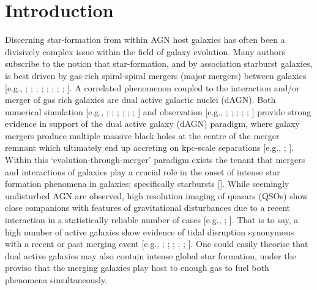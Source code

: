 \section{Introduction}

Discerning star-formation from within AGN host galaxies has often been a divisively complex issue within the field of galaxy evolution. Many authors subscribe to the notion that star-formation, and by association starburst galaxies, is best driven by gas-rich spiral-spiral mergers (major mergers) between galaxies [e.g., \cite{thews_Neugebauer_Scoville_1988}; \cite{Mihos_Hernquist_1996}; \cite{1997AA...326..537D}; \cite{Barton_Geller_Kenyon_2000}; \cite{Tissera_Dominguez-Tenreiro_Scannapieco_Saiz_2002}; \cite{2005A&A...438...87K}; \cite{Narayanan_Groppi_Kulesa_Walker_2005}; \cite{Narayanan_Hayward_Murray_2013}; \cite{Scott_Kaviraj_2013}]. A correlated phenomenon coupled to the interaction and/or merger of gas rich galaxies are dual active galactic nuclei (dAGN). Both numerical simulation [e.g., \cite{Hoffman_Loeb_2007}; \cite{a_Eichhorn_Makino_Spurzem_2010}; \cite{Shen_2010}; \cite{Yu_2011}; \cite{2013MNRAS.429.2594B}; \cite{Kulkarni_Loeb_2012}; \cite{Van_Wassenhove_2014}] and observation [e.g., \cite{ice_Ivison_Lin_Koo_et_al__2007}; \cite{2009ApJ...702L..82C}; \cite{ario_Shields_Smith_Wright_2011}; \cite{nen_Chapman_Bonning_Chiba_2012}; \cite{Barrows_2013}; \cite{Huang_2014}] provide strong evidence in support of the dual active galaxy (dAGN) paradigm, where galaxy mergers produce multiple massive black holes at the centre of the merger remnant which ultimately end up accreting on kpc-scale separations [e.g., \cite{Liu_Greene_Shen_Strauss_2010}; \cite{obel_Comerford_Middelberg_2014}].  Within this `evolution-through-merger' paradigm exists the tenant that mergers and interactions of galaxies play a crucial role in the onset of intense star formation phenomena in galaxies; specifically starbursts [\cite{1984MNRAS.209..111J}]. While seemingly undisturbed AGN are observed, high resolution imaging of quasars (QSOs) show close companions with features of gravitational disturbances due to a recent interaction in a statistically reliable number of cases [e.g., \cite{Bahcall_Kirhakos_Saxe_Schneider_1997}; \cite{Bennert_2008}]. That is to say, a high number of active galaxies show evidence of tidal disruption synonymous with a recent or past merging event [e.g., \cite{Sanders_1988}; \cite{Hutchings_1988}; \cite{Graham_1990}; \cite{Keel_1996}; \cite{Schmitt_2001}; \cite{Alonso_2007}]. One could easily theorise that dual active galaxies may also contain intense global star formation, under the proviso that the merging galaxies play host to enough gas to fuel both phenomena simultaneously.  

